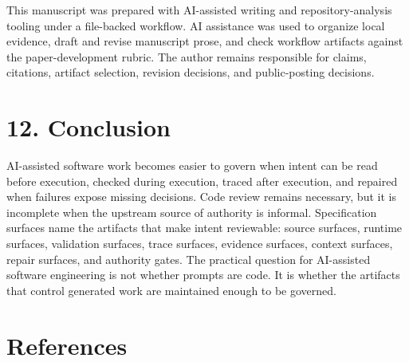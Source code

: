 \documentclass[
]{article}
\begin{document}
This manuscript was prepared with AI-assisted writing and
repository-analysis tooling under a file-backed workflow. AI assistance
was used to organize local evidence, draft and revise manuscript prose,
and check workflow artifacts against the paper-development rubric. The
author remains responsible for claims, citations, artifact selection,
revision decisions, and public-posting decisions.

\section{12. Conclusion}\label{conclusion}

AI-assisted software work becomes easier to govern when intent can be
read before execution, checked during execution, traced after execution,
and repaired when failures expose missing decisions. Code review remains
necessary, but it is incomplete when the upstream source of authority is
informal. Specification surfaces name the artifacts that make intent
reviewable: source surfaces, runtime surfaces, validation surfaces,
trace surfaces, evidence surfaces, context surfaces, repair surfaces,
and authority gates. The practical question for AI-assisted software
engineering is not whether prompts are code. It is whether the artifacts
that control generated work are maintained enough to be governed.

\section{References}\label{references}
\end{document}
